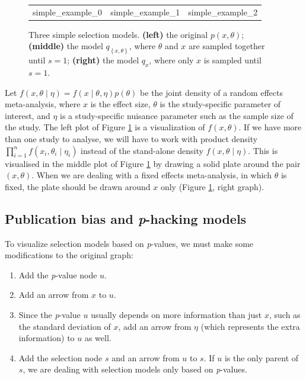 \documentclass{article}
\theoremstyle{plain}
\theoremstyle{definition}
\begin{document}
\begin{figure}
\begin{center}     
 \begin{tabular}{ccc}   
  {simple_example_0} &   
   {simple_example_1} & 
   {simple_example_2}
 \end{tabular} 
\end{center}

\caption{\label{fig:Plate notation, simple example} Three simple selection models. {\bf (left)} the original $p(x,\theta)$; {\bf (middle)} the model $q_{\left\{ x,\theta\right\} }$, where $\theta$ and $x$ are
sampled together until $s=1$; {\bf (right)} the model $q_{x}$, where only $x$ is sampled until $s=1$.}
\end{figure}

Let $f(x,\theta\mid\eta)=f(x\mid\theta,\eta)p(\theta)$
be the joint density of a random effects meta-analysis, where $x$ is the effect size, $\theta$ is the study-specific parameter of interest, and $\eta$ is a study-specific nuisance parameter such as the sample size of the study. The left plot of Figure \ref{fig:Plate notation, simple example} is a visualization of $f(x,\theta)$. If we have more than one study to analyse, we will have to work with product density $\prod_{i=1}^{n}f(x_{i},\theta_{i}\mid\eta_{i})$ instead of the stand-alone density $f(x,\theta\mid\eta)$. This is visualised in the middle plot of Figure \ref{fig:Plate notation, simple example}  by drawing a solid plate around the pair $(x,\theta)$. When we are dealing with a fixed effects meta-analysis, in which $\theta$ is fixed, the plate should be drawn around $x$ only (Figure \ref{fig:Plate notation, simple example}, right graph). 


\subsection{Publication bias and \textit{p}-hacking models\label{subsec:Selection sets, meta analysis}}

To visualize selection models based on \textit{p}-values, we must make some modifications to the original graph:

\begin{enumerate}[label=\roman*]
\item Add the \textit{p}-value node $u$.
\item Add an arrow from $x$ to $u$. 
\item Since the \textit{p}-value $u$ usually depends on more information than just $x$, such as the standard deviation of $x$, add an arrow from $\eta$ (which represents the extra information) to $u$ as well.
\item Add the selection node $s$ and an arrow from $u$ to $s$. If $u$ is the only parent of $s$, we are dealing with selection models only based on
\textit{p}-values. 
\end{enumerate}
\end{document}
